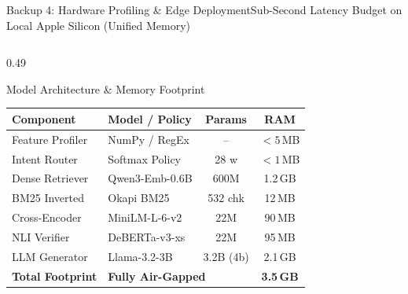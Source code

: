 \documentclass[aspectratio=169,10pt]{beamer}
\begin{document}
\begin{frame}{Backup 4: Hardware Profiling \& Edge Deployment}{Sub-Second Latency Budget on Local Apple Silicon (Unified Memory)}
  \begin{columns}[T]
    \begin{column}{0.49\textwidth}
      \begin{block}{Model Architecture \& Memory Footprint}
        \centering\scriptsize
        \setlength{\tabcolsep}{2.5pt}
        \renewcommand{\arraystretch}{0.78}
        \begin{tabular}{@{}llcc@{}}
          \toprule
          \textbf{Component} & \textbf{Model / Policy} & \textbf{Params} & \textbf{RAM} \\
          \midrule
          Feature Profiler & NumPy / RegEx & -- & $< 5$\,MB \\
          Intent Router & Softmax Policy & 28 w & $< 1$\,MB \\
          Dense Retriever & Qwen3-Emb-0.6B & 600M & 1.2\,GB \\
          BM25 Inverted & Okapi BM25 & 532 chk & 12\,MB \\
          Cross-Encoder & MiniLM-L-6-v2 & 22M & 90\,MB \\
          NLI Verifier & DeBERTa-v3-xs & 22M & 95\,MB \\
          LLM Generator & Llama-3.2-3B & 3.2B (4b) & 2.1\,GB \\
          \midrule
          \textbf{Total Footprint} & \multicolumn{2}{l}{\textbf{Fully Air-Gapped}} & \textbf{3.5\,GB} \\
          \bottomrule
        \end{tabular}
      \end{block}
    \end{column}


\end{columns}
\end{frame}
\end{document}
